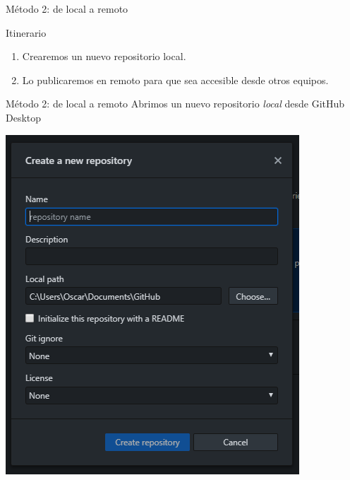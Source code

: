 \documentclass[aspectratio=169, xcolor={usenames,svgnames,dvipsnames}]{beamer}
\begin{document}
\begin{frame}[label={sec:org618e6d0}]{Método 2: de local a remoto}
\begin{block}{Itinerario}
\begin{enumerate}
\item Crearemos un nuevo repositorio \alert{local}.
\item Lo publicaremos en remoto para que sea accesible desde otros equipos.
\end{enumerate}
\end{block}
\end{frame}

\begin{frame}[label={sec:orgd79d701}]{Método 2: de local a remoto}
Abrimos un nuevo repositorio \emph{local} desde GitHub Desktop

\begin{center}
\end{center}

\begin{center}
\includegraphics[height=0.7\textheight]{figs/Desktop_NewRepository.png}
\end{center}
\end{frame}
\end{document}
